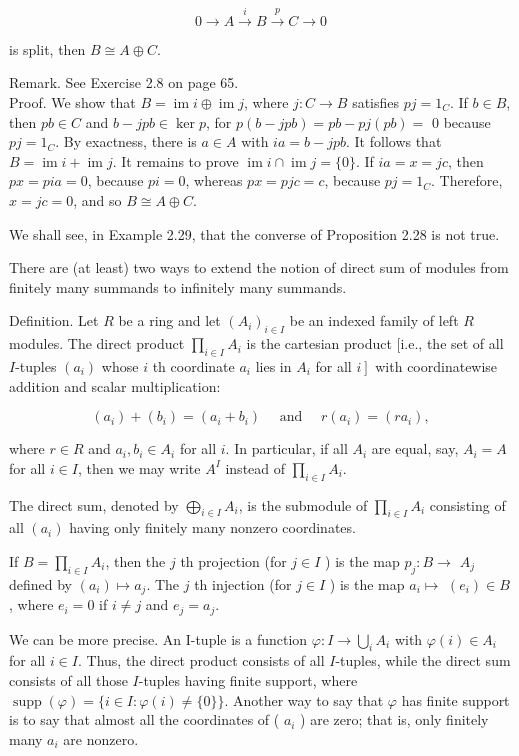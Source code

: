 \documentclass[10pt]{article}
\begin{document}
$$
0 \rightarrow A \xrightarrow{i} B \xrightarrow{p} C \rightarrow 0
$$

is split, then $B \cong A \oplus C$.

Remark. See Exercise 2.8 on page 65.\\
Proof. We show that $B=\operatorname{im} i \oplus \operatorname{im} j$, where $j: C \rightarrow B$ satisfies $p j=1_{C}$. If $b \in B$, then $p b \in C$ and $b-j p b \in \operatorname{ker} p$, for $p(b-j p b)=p b-p j(p b)=$ 0 because $p j=1_{C}$. By exactness, there is $a \in A$ with $i a=b-j p b$. It follows that $B=\operatorname{im} i+\operatorname{im} j$. It remains to prove $\operatorname{im} i \cap \operatorname{im} j=\{0\}$. If $i a=x=j c$, then $p x=p i a=0$, because $p i=0$, whereas $p x=p j c=c$, because $p j=1_{C}$. Therefore, $x=j c=0$, and so $B \cong A \oplus C$.

We shall see, in Example 2.29, that the converse of Proposition 2.28 is not true.

There are (at least) two ways to extend the notion of direct sum of modules from finitely many summands to infinitely many summands.

Definition. Let $R$ be a ring and let $\left(A_{i}\right)_{i \in I}$ be an indexed family of left $R$ modules. The direct product $\prod_{i \in I} A_{i}$ is the cartesian product [i.e., the set of all $I$-tuples $\left(a_{i}\right)$ whose $i$ th coordinate $a_{i}$ lies in $A_{i}$ for all $\left.i\right]$ with coordinatewise addition and scalar multiplication:

$$
\left(a_{i}\right)+\left(b_{i}\right)=\left(a_{i}+b_{i}\right) \quad \text { and } \quad r\left(a_{i}\right)=\left(r a_{i}\right),
$$

where $r \in R$ and $a_{i}, b_{i} \in A_{i}$ for all $i$. In particular, if all $A_{i}$ are equal, say, $A_{i}=A$ for all $i \in I$, then we may write $A^{I}$ instead of $\prod_{i \in I} A_{i}$.

The direct sum, denoted by $\bigoplus_{i \in I} A_{i}$, is the submodule of $\prod_{i \in I} A_{i}$ consisting of all $\left(a_{i}\right)$ having only finitely many nonzero coordinates.

If $B=\prod_{i \in I} A_{i}$, then the $j$ th projection (for $j \in I$ ) is the map $p_{j}: B \rightarrow$ $A_{j}$ defined by $\left(a_{i}\right) \mapsto a_{j}$. The $j$ th injection (for $j \in I$ ) is the map $a_{i} \mapsto$ $\left(e_{i}\right) \in B$, where $e_{i}=0$ if $i \neq j$ and $e_{j}=a_{j}$.

We can be more precise. An I-tuple is a function $\varphi: I \rightarrow \bigcup_{i} A_{i}$ with $\varphi(i) \in A_{i}$ for all $i \in I$. Thus, the direct product consists of all $I$-tuples, while the direct sum consists of all those $I$-tuples having finite support, where $\operatorname{supp}(\varphi)=\{i \in I: \varphi(i) \neq\{0\}\}$. Another way to say that $\varphi$ has finite support is to say that almost all the coordinates of ( $a_{i}$ ) are zero; that is, only finitely many $a_{i}$ are nonzero.
\end{document}
